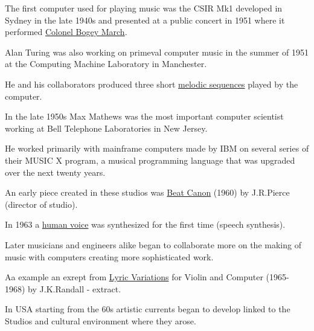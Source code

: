 The first computer used for playing music was the CSIR Mk1 developed in Sydney in the late 1940s and presented at a public concert in 1951 where
it performed \href{http://www.musicaecodice.it/gitmedia/emc/4_media/colonel.mp3}{Colonel Bogey March}.

Alan Turing was also working on primeval computer music in the summer of 1951 at the Computing Machine Laboratory in Manchester.

He and his collaborators produced three short \href{http://www.musicaecodice.it/gitmedia/emc/4_media/godsave.mp3}{melodic sequences} played by the computer.

In the late 1950s Max Mathews was the most important computer scientist working at Bell Telephone Laboratories in New Jersey.

He worked primarily with mainframe computers made by IBM on several series of their MUSIC X program, a musical programming language that was upgraded over the next twenty years.

An early piece created in these studios was \href{http://www.musicaecodice.it/gitmedia/emc/4_media/canon.mp3}{Beat Canon} (1960) by J.R.Pierce (director of studio).

In 1963 a \href{http://www.musicaecodice.it/gitmedia/emc/4_media/speech.mp3}{human voice} was synthesized for the first time (speech synthesis).

Later musicians and engineers alike began to collaborate more on the making of music with computers creating more sophisticated work.

Aa example an exrept from \href{http://www.musicaecodice.it/gitmedia/emc/4_media/violin.mp3}{Lyric Variations} for Violin and Computer (1965-1968) by J.K.Randall - extract.

In USA starting from the 60s artistic currents began to develop linked to the Studios and cultural environment where they arose.

